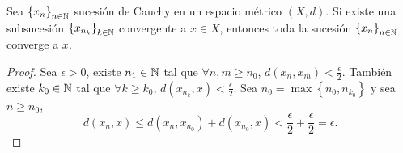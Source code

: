 \begin{lema}
	Sea $\displaystyle \left\{ x_{n}\right\} _{n\in\mathbb{N}} $ sucesión de Cauchy en un espacio métrico $\displaystyle \left(X,d\right) $. Si existe una subsucesión $\displaystyle \left\{ x_{n_{k}}\right\}_{k \in \mathbb{N}} $ convergente a $\displaystyle x \in X $, entonces toda la sucesión $\displaystyle \left\{ x_{n}\right\}_{n \in \mathbb{N}} $ converge a $\displaystyle x $.
\end{lema}
\begin{proof}
	Sea $\displaystyle \epsilon > 0 $, existe $\displaystyle n_{1} \in \mathbb{N} $ tal que $\displaystyle \forall n,m \geq n_{0} $, $\displaystyle d\left(x_{n}, x_{m}\right) < \frac{\epsilon }{2} $. También existe $\displaystyle k_{0} \in \mathbb{N} $ tal que $\displaystyle \forall k \geq k_{0} $, $\displaystyle d\left(x_{n_{k}},x\right) < \frac{\epsilon }{2} $. Sea $\displaystyle n_{0} = \max \left\{ n_{0}, n_{k_{0}}\right\}  $ y sea $\displaystyle n \geq n_{0} $,
	\[d\left(x_{n}, x\right) \leq d\left(x_{n}, x_{n_{0}}\right) + d\left(x_{n_{0}}, x\right) < \frac{\epsilon }{2} + \frac{\epsilon }{2} = \epsilon  .\]
\end{proof}

